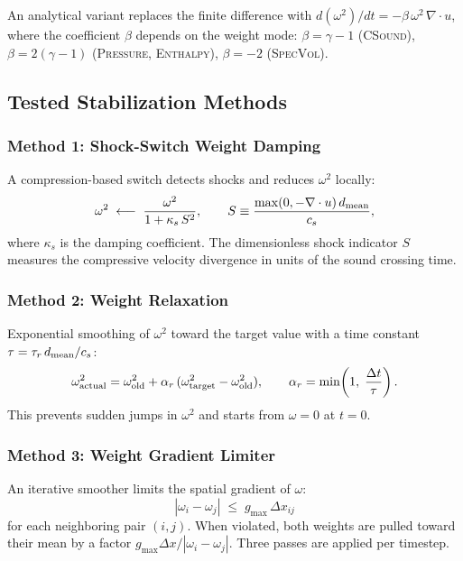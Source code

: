 \documentclass[twocolumn]{aastex63}
\newcommand{\vel}{{u}}
\begin{document}
An analytical variant replaces the finite difference with
$d(\omega^2)/dt = -\beta\,\omega^2\,\nabla\cdot\vel$, where the
coefficient $\beta$ depends on the weight mode:
$\beta = \gamma-1$ (\textsc{CSound}),
$\beta = 2(\gamma-1)$ (\textsc{Pressure}, \textsc{Enthalpy}),
$\beta = -2$ (\textsc{SpecVol}).

\subsection{Tested Stabilization Methods}

\subsubsection{Method 1: Shock-Switch Weight Damping}
A compression-based switch detects shocks and reduces $\omega^2$
locally:
\begin{equation}
  \omega^2 \;\longleftarrow\; \frac{\omega^2}{1 + \kappa_s\, S^2},
  \qquad S \equiv \frac{\max(0,-\nabla\cdot\vel)\,d_{\rm mean}}{c_s},
\end{equation}
where $\kappa_s$ is the damping coefficient.  The dimensionless
shock indicator $S$ measures the compressive velocity divergence
in units of the sound crossing time.

\subsubsection{Method 2: Weight Relaxation}
Exponential smoothing of $\omega^2$ toward the target value
with a time constant $\tau = \tau_r\, d_{\rm mean}/c_s$:
\begin{equation}
  \omega^{2}_{\rm actual} = \omega^{2}_{\rm old}
    + \alpha_r\,(\omega^{2}_{\rm target} - \omega^{2}_{\rm old}),
  \qquad \alpha_r = \min\!\left(1,\;\frac{\Delta t}{\tau}\right).
\end{equation}
This prevents sudden jumps in $\omega^2$ and starts from
$\omega=0$ at $t=0$.

\subsubsection{Method 3: Weight Gradient Limiter}
An iterative smoother limits the spatial gradient of $\omega$:
\begin{equation}
  \left|\omega_i - \omega_j\right| \;\le\; g_{\max}\,\Delta x_{ij}
\end{equation}
for each neighboring pair $(i,j)$.  When violated, both weights are
pulled toward their mean by a factor $g_{\max}\Delta x / |\omega_i-\omega_j|$.
Three passes are applied per timestep.
\end{document}

